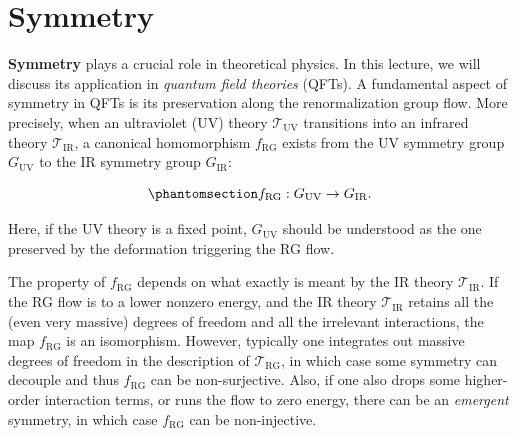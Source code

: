 \documentclass[
  letterpaper,
  DIV=11,
  numbers=noendperiod]{scrreport}
\begin{document}
\section{Symmetry}\label{symmetry}

\textbf{Symmetry} plays a crucial role in theoretical physics. In this
lecture, we will discuss its application in \emph{quantum field
theories} (QFTs). A fundamental aspect of symmetry in QFTs is its
preservation along the renormalization group flow. More precisely, when
an ultraviolet (UV) theory \(\mathcal{T}_\text{UV}\) transitions into an
infrared theory \(\mathcal{T}_\text{IR}\), a canonical homomorphism
\(f_\text{RG}\) exists from the UV symmetry group \(G_\text{UV}\) to the
IR symmetry group \(G_\text{IR}\):

\begin{tcolorbox}[enhanced jigsaw, opacityback=0, colback=white, colframe=quarto-callout-important-color-frame, title=\textcolor{quarto-callout-important-color}{\faExclamation}\hspace{0.5em}{RG flow homomorphism from UV symmetry to IR symmetry}, breakable, coltitle=black, arc=.35mm, opacitybacktitle=0.6, bottomrule=.15mm, bottomtitle=1mm, left=2mm, toprule=.15mm, titlerule=0mm, rightrule=.15mm, leftrule=.75mm, toptitle=1mm, colbacktitle=quarto-callout-important-color!10!white]

\begin{equation}\phantomsection\label{eq-RG-group-match}{
f_\text{RG} : G_\text{UV} \to G_\text{IR}.
}\end{equation}

\end{tcolorbox}

Here, if the UV theory is a fixed point, \(G_\text{UV}\) should be
understood as the one preserved by the deformation triggering the RG
flow.

\begin{tcolorbox}[enhanced jigsaw, opacityback=0, colback=white, colframe=quarto-callout-note-color-frame, title=\textcolor{quarto-callout-note-color}{\faInfo}\hspace{0.5em}{Property of \(f_\text{RG}\)}, breakable, coltitle=black, arc=.35mm, opacitybacktitle=0.6, bottomrule=.15mm, bottomtitle=1mm, left=2mm, toprule=.15mm, titlerule=0mm, rightrule=.15mm, leftrule=.75mm, toptitle=1mm, colbacktitle=quarto-callout-note-color!10!white]

The property of \(f_\text{RG}\) depends on what exactly is meant by the
IR theory \(\mathcal{T}_\text{IR}\). If the RG flow is to a lower
nonzero energy, and the IR theory \(\mathcal{T}_\text{IR}\) retains all
the (even very massive) degrees of freedom and all the irrelevant
interactions, the map \(f_\text{RG}\) is an isomorphism. However,
typically one integrates out massive degrees of freedom in the
description of \(\mathcal{T}_\text{RG}\), in which case some symmetry
can decouple and thus \(f_\text{RG}\) can be non-surjective. Also, if
one also drops some higher-order interaction terms, or runs the flow to
zero energy, there can be an \emph{emergent} symmetry, in which case
\(f_\text{RG}\) can be non-injective.

\end{tcolorbox}
\end{document}
